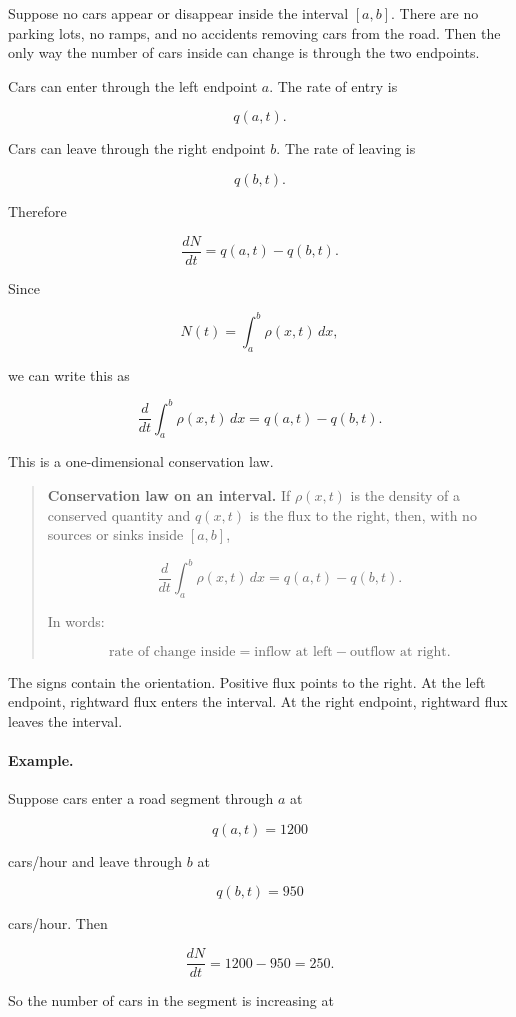 Suppose no cars appear or disappear inside the interval \([a,b]\).  There are no
parking lots, no ramps, and no accidents removing cars from the road.  Then the
only way the number of cars inside can change is through the two endpoints.

Cars can enter through the left endpoint \(a\).  The rate of entry is

\[
q(a,t).
\]

Cars can leave through the right endpoint \(b\).  The rate of leaving is

\[
q(b,t).
\]

Therefore

\[
\boxed{
\frac{dN}{dt}=q(a,t)-q(b,t).
}
\]

Since

\[
N(t)=\int_a^b \rho(x,t)\,dx,
\]

we can write this as

\[
\boxed{
\frac{d}{dt}\int_a^b \rho(x,t)\,dx
=
q(a,t)-q(b,t).
}
\]

This is a one-dimensional conservation law.

\begin{quote}
\textbf{Conservation law on an interval.}
If \(\rho(x,t)\) is the density of a conserved quantity and \(q(x,t)\) is the flux to the
right, then, with no sources or sinks inside \([a,b]\),

\[
\boxed{
\frac{d}{dt}\int_a^b \rho(x,t)\,dx
=
q(a,t)-q(b,t).
}
\]

In words:

\[
\boxed{
\text{rate of change inside}=\text{inflow at left}-\text{outflow at right}.
}
\]
\end{quote}

The signs contain the orientation.  Positive flux points to the right.  At the left
endpoint, rightward flux enters the interval.  At the right endpoint, rightward flux
leaves the interval.

\paragraph{Example.}
Suppose cars enter a road segment through \(a\) at

\[
q(a,t)=1200
\]

cars/hour and leave through \(b\) at

\[
q(b,t)=950
\]

cars/hour.  Then

\[
\frac{dN}{dt}=1200-950=250.
\]

So the number of cars in the segment is increasing at

